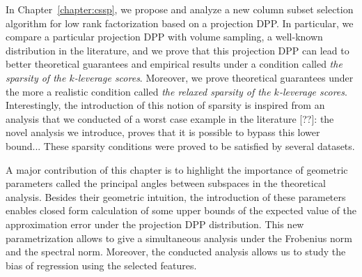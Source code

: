 \documentclass[twoside,11pt]{book}
\numberwithin{theorem}{chapter}
\numberwithin{definition}{chapter}
\numberwithin{proposition}{chapter}
\numberwithin{corollary}{chapter}
\numberwithin{example}{chapter}
\numberwithin{lemma}{chapter}
\numberwithin{assumption}{chapter}
\begin{document}
In Chapter~\ref{chapter:cssp}, we propose and analyze a new column subset selection algorithm for low rank factorization based on a projection DPP. 
In particular, we compare a particular projection DPP with volume sampling, a well-known distribution in the literature, and we prove that this projection DPP can lead to better theoretical guarantees and empirical results under a condition called \emph{the sparsity of the $k$-leverage scores}. Moreover, we prove theoretical guarantees under the more a realistic condition called \emph{the relaxed sparsity of the $k$-leverage scores}. Interestingly, the introduction of this notion of sparsity is inspired from an analysis that we conducted of a worst case example in the literature [??]: the novel analysis we introduce, proves that it is possible to bypass this lower bound... These sparsity conditions were proved to be satisfied by several datasets. 

A major contribution of this chapter is to highlight the importance of geometric parameters called the principal angles between subspaces in the theoretical analysis. Besides their geometric intuition, the introduction of these parameters enables closed form calculation of some upper bounds of the expected value of the approximation error under the projection DPP distribution.
This new parametrization allows to give a simultaneous analysis under the Frobenius norm and the spectral norm. Moreover, the conducted analysis allows us to study the bias of regression using the selected features.





\end{document}
